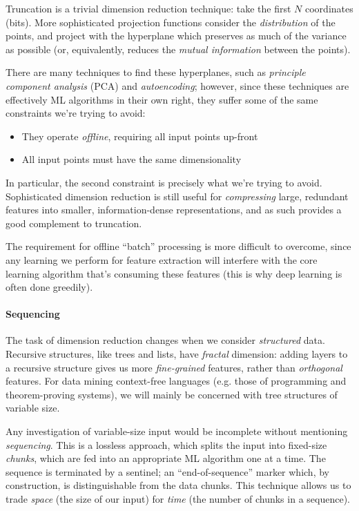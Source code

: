 Truncation is a trivial dimension reduction technique: take the first $N$
coordinates (bits). More sophisticated projection functions consider the
\emph{distribution} of the points, and project with the hyperplane which
preserves as much of the variance as possible (or, equivalently, reduces the
\emph{mutual information} between the points).

There are many techniques to find these hyperplanes, such as \emph{principle
  component analysis} (PCA) and \emph{autoencoding}; however, since these
techniques are effectively ML algorithms in their own right, they suffer some of
the same constraints we're trying to avoid:

\begin{itemize}
  \item They operate \emph{offline}, requiring all input points up-front
  \item All input points must have the same dimensionality
\end{itemize}

In particular, the second constraint is precisely what we're trying to
avoid. Sophisticated dimension reduction is still useful for \emph{compressing}
large, redundant features into smaller, information-dense representations, and
as such provides a good complement to truncation.

The requirement for offline ``batch'' processing is more difficult to overcome,
since any learning we perform for feature extraction will interfere with the
core learning algorithm that's consuming these features (this is why deep
learning is often done greedily).

\paragraph{Sequencing}

The task of dimension reduction changes when we consider \emph{structured}
data. Recursive structures, like trees and lists, have \emph{fractal} dimension:
adding layers to a recursive structure gives us more \emph{fine-grained}
features, rather than \emph{orthogonal} features. For data mining context-free
languages (e.g. those of programming and theorem-proving systems), we will
mainly be concerned with tree structures of variable size.

Any investigation of variable-size input would be incomplete without mentioning
\emph{sequencing}. This is a lossless approach, which splits the input into
fixed-size \emph{chunks}, which are fed into an appropriate ML algorithm one at
a time. The sequence is terminated by a sentinel; an ``end-of-sequence'' marker
which, by construction, is distinguishable from the data chunks. This technique
allows us to trade \emph{space} (the size of our input) for \emph{time} (the
number of chunks in a sequence).

